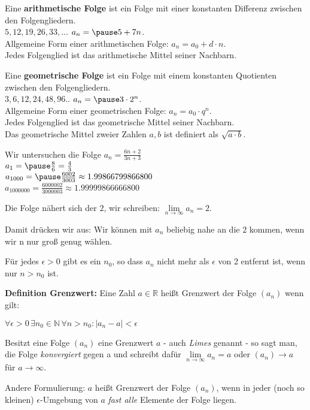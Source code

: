 \begin{frame}[fragile]
Eine \textbf{arithmetische Folge} ist ein Folge mit einer konstanten Differenz zwischen den Folgengliedern. \\
$5, 12,19,26,33,...$ \pause \quad $a_n = \pause 5 + 7n$. \\ \pause
Allgemeine Form einer arithmetischen Folge: $a_n = a_0 + d \cdot n$. \\ \pause
Jedes Folgenglied ist das arithmetische Mittel seiner Nachbarn. \bigskip \pause

Eine \textbf{geometrische Folge} ist ein Folge mit einem konstanten Quotienten zwischen den Folgengliedern. \\
$3, 6,12,24,48,96..$ \pause \quad $a_n = \pause 3 \cdot 2^n$. \\ \pause
Allgemeine Form einer geometrischen Folge: $a_n = a_0 \cdot q^n$. \\ \pause
Jedes Folgenglied ist das geometrische Mittel seiner Nachbarn. \\ \pause
Das geometrische Mittel zweier Zahlen $a,b$ ist definiert als $\sqrt{a\cdot b}.$
\end{frame}

\begin{frame}[fragile]
Wir untersuchen die Folge $a_n = \frac{6n+2}{3n+3}$ \\ \pause
$a_1 = \pause \frac{8}{6} = \frac{4}{3}$ \\ \pause
$a_{1000} = \pause \frac{6002}{3003} \approx 1.99866799866800$ \\ \pause
$a_{1000000} =  \frac{6000002}{3000003} \approx 1.99999866666800$ \bigskip \pause

Die Folge nähert sich der $2$, wir schreiben: $\lim \limits_{n \to \infty} a_n = 2$. \pause

Damit drücken wir aus: Wir können mit $a_n$ beliebig nahe an die $2$ kommen, wenn wir n nur groß genug wählen. \pause

Für jedes $\epsilon > 0$ gibt es ein $n_0$, so dass $a_n$ nicht mehr als $\epsilon$ von 2 entfernt ist, wenn nur 
$n > n_0$ ist.
\end{frame}

\begin{frame}[fragile]
\textbf{Definition Grenzwert:} Eine Zahl $a \in \mathbb{R}$ heißt Grenzwert der Folge $(a_n)$ wenn gilt:  

$\forall \epsilon > 0 \, \exists n_0 \in \mathbb{N} \, \forall n > n_0 : \vert a_n - a \vert < \epsilon$  \pause

Besitzt eine Folge $(a_n)$ eine Grenzwert $a$ - auch \textit{Limes} genannt - so sagt man, die Folge \textit{konvergiert} 
gegen a und schreibt dafür $\lim \limits_{n \to \infty} a_n = a$ oder $(a_n) \rightarrow a$ für $a \rightarrow \infty$. \pause

Andere Formulierung: $a$ heißt Grenzwert der Folge $(a_n)$, wenn in jeder (noch so kleinen) $\epsilon$-Umgebung von $a$ \textit{fast alle} Elemente der Folge liegen.
\end{frame}

